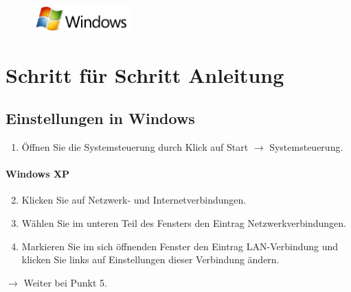 \documentclass[a4paper,12pt,draft]{scrartcl}
\begin{document}
\newpage
\enlargethispage{20pt}

\begin{figure}[t!]
    \raggedleft
    \vspace{-20pt}
    \includegraphics[height=1cm,keepaspectratio]{Bilder/Windows_logo}
    \vspace{-20pt}
\end{figure}

\section*{Schritt für Schritt Anleitung}
\subsection*{Einstellungen in Windows}
\begin{enumerate}
    \item Öffnen Sie die Systemsteuerung durch Klick auf Start $\rightarrow$ Systemsteuerung.
\end{enumerate}
\vspace{-15pt}
\paragraph*{Windows XP}
\begin{enumerate}
     \setcounter{enumi}{1}
     \item Klicken Sie auf Netzwerk- und Internetverbindungen.
     \item Wählen Sie im unteren Teil des Fensters den Eintrag Netzwerkverbindungen. 
     \item Markieren Sie im sich öffnenden Fenster den Eintrag LAN-Verbindung und klicken Sie links auf Einstellungen dieser Verbindung ändern.
\end{enumerate}
$\rightarrow$ Weiter bei Punkt 5.
\vspace{-10pt}
\end{document}
